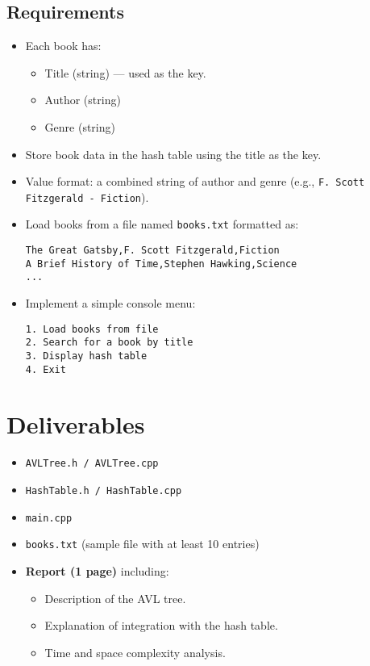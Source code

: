 \documentclass[11pt]{article}
\begin{document}
\subsection*{Requirements}
\begin{itemize}
  \item Each book has:
    \begin{itemize}
      \item Title (string) — used as the key.
      \item Author (string)
      \item Genre (string)
    \end{itemize}
  \item Store book data in the hash table using the title as the key.
  \item Value format: a combined string of author and genre (e.g., \texttt{F. Scott Fitzgerald - Fiction}).
  \item Load books from a file named \texttt{books.txt} formatted as:
\begin{lstlisting}[basicstyle=\ttfamily]
The Great Gatsby,F. Scott Fitzgerald,Fiction
A Brief History of Time,Stephen Hawking,Science
...
\end{lstlisting}
  \item Implement a simple console menu:
\begin{lstlisting}[basicstyle=\ttfamily]
1. Load books from file
2. Search for a book by title
3. Display hash table
4. Exit
\end{lstlisting}
\end{itemize}

\section*{Deliverables}
\begin{itemize}
  \item \texttt{AVLTree.h / AVLTree.cpp}
  \item \texttt{HashTable.h / HashTable.cpp}
  \item \texttt{main.cpp}
  \item \texttt{books.txt} (sample file with at least 10 entries)
  \item \textbf{Report (1 page)} including:
    \begin{itemize}
      \item Description of the AVL tree.
      \item Explanation of integration with the hash table.
      \item Time and space complexity analysis.
    \end{itemize}
\end{itemize}
\end{document}
